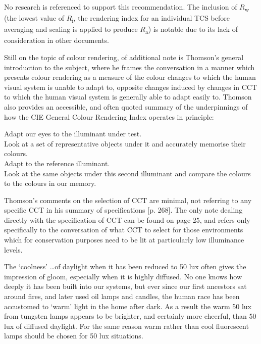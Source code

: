 No research is referenced to support this recommendation. The inclusion of $R$\textsubscript{w} (the lowest value of $R$\textsubscript{i}, the rendering index for an individual \gls{TCS} before averaging and scaling is applied to produce $R$\textsubscript{a}) is notable due to its lack of consideration in other documents. 

Still on the topic of colour rendering, of additional note is Thomson's general introduction to the subject, where he frames the conversation in a manner which presents colour rendering as a measure of the colour changes to which the human visual system is unable to adapt to, opposite changes induced by changes in \gls{CCT} to which the human visual system is generally able to adapt easily to. Thomson also provides an accessible, and often quoted summary of the underpinnings of how the \gls{CIE} General Colour Rendering Index operates in principle:

\begin{itquote}{}
Adapt our eyes to the illuminant under test. \\
Look at a set of representative objects under it and accurately memorise their colours.\\
Adapt to the reference illuminant.\\
Look at the same objects under this second illuminant and compare the colours to the colours in our memory.
\end{itquote}

Thomson's comments on the selection of \gls{CCT} are minimal, not referring to any specific \gls{CCT} in his summary of specifications [p. 268]. The only note dealing directly with the specification of \gls{CCT} can be found on page 25, and refers only specifically to the conversation of what \gls{CCT} to select for those environments which for conservation purposes need to be lit at particularly low illuminance levels.

\begin{itquote}{}
The `coolness' \dots of daylight when it has been reduced to 50 lux often gives the impression of gloom, especially when it is highly diffused. No one knows how deeply it has been built into our systems, but ever since our first ancestors sat around fires, and later used oil lamps and candles, the human race has been accustomed to `warm' light in the home after dark. As a result the warm 50 lux from tungsten lamps appears to be brighter, and certainly more cheerful, than 50 lux of diffused daylight. For the same reason warm rather than cool fluorescent lamps should be chosen for 50 lux situations.
\end{itquote}

